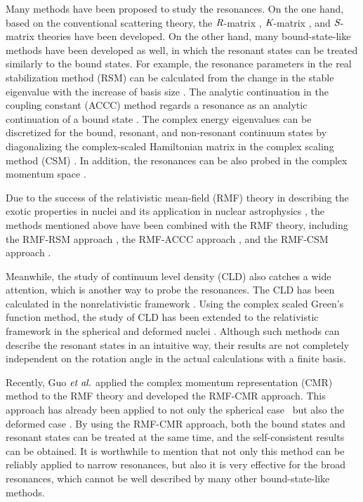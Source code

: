 \documentclass[twocolumn,prc,preprintnumbers,superscriptaddress,floatfix,showpacs]{revtex4}
\begin{document}
Many methods have been proposed to study the resonances. On the one hand, based on the conventional scattering theory, the $\emph{R}$-matrix \cite{Wigner1947,Hale1987}, $\emph{K}$-matrix \cite{Humblet1991}, and $\emph{S}$-matrix \cite{Taylor1972} theories have been developed. On the other hand, many bound-state-like methods have been developed as well, in which the resonant states can be treated similarly to the bound states. For example, the resonance parameters in the real stabilization method (RSM) can be calculated from the change in the stable eigenvalue with the increase of basis size \cite{Hazi1970}. The analytic continuation in the coupling constant (ACCC) method regards a resonance as an analytic continuation of a bound state \cite{Kukulin1989}. The complex energy eigenvalues can be discretized for the bound, resonant, and non-resonant continuum states by diagonalizing the complex-scaled Hamiltonian matrix in the complex scaling method (CSM) \cite{Aguilar1971, Balslev1971, Simon1972, Myo2014}. In addition, the resonances can be also probed in the complex momentum space \cite{Sukumar1979, Kwon1978, Berggren1968}.

Due to the success of the relativistic mean-field (RMF) theory in describing the exotic properties in nuclei \cite{Walecka1974, Serot1986, Ring1996, Vretenar2005, Liang2015, Liang2008, Niu2013a, Niu2017,Paar2009} and its application in nuclear astrophysics \cite{Sun2008, Niu2009, Xu2013, Niu2013, Niu2011}, the methods mentioned above have been combined with the RMF theory, including the RMF-RSM approach \cite{Zhang2008}, the RMF-ACCC approach \cite{Yang2001, Zhang2004}, and the RMF-CSM approach \cite{Guo2005}.

Meanwhile, the study of continuum level density (CLD) also catches a wide attention, which is another way to probe the resonances. The CLD has been calculated in the nonrelativistic framework \cite{Suzuki2005}. Using the complex scaled Green's function method, the study of CLD has been extended to the relativistic framework in the spherical and deformed nuclei \cite{Shi2014, Shi2017}. Although such methods can describe the resonant states in an intuitive way, their results are not completely independent on the rotation angle in the actual calculations with a finite basis.

Recently, Guo $\emph{et al.}$ applied the complex momentum representation (CMR) method to the RMF theory and developed the RMF-CMR approach. This approach has already been applied to not only the spherical case~\cite{Li2016} but also the deformed case \cite{Fang2017}. By using the RMF-CMR approach, both the bound states and resonant states can be treated at the same time, and the self-consistent results can be obtained. It is worthwhile to mention that not only this method can be reliably applied to narrow resonances, but also it is very effective for the broad resonances, which cannot be well described by many other bound-state-like methods.
\end{document}
